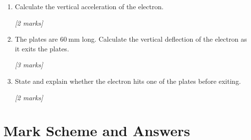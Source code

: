 \begin{tcolorbox}[colback=white, colframe=midblue, breakable]
\begin{minipage}{\linewidth}
\begin{enumerate}[label=(\alph*)]
  \item Calculate the vertical acceleration of the electron.
  \par\hfill\textit{[2 marks]}
  \vspace{3cm}

  \item The plates are $60\ \text{mm}$ long. Calculate the vertical deflection of the electron as it exits the plates.
  \par\hfill\textit{[3 marks]}
  \vspace{4cm}

  \item State and explain whether the electron hits one of the plates before exiting.
  \par\hfill\textit{[2 marks]}
  \vspace{3cm}
\end{enumerate}
\end{minipage}

\end{tcolorbox}

\section{Mark Scheme and Answers}

